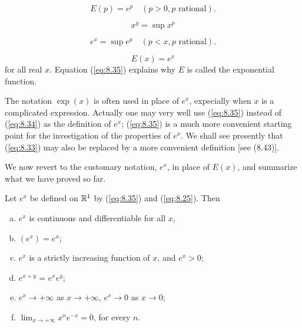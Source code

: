 \begin{equation}
    \label{eq:8.32}
    E(p) = e^p
    \quad (p>0, p \text{ rational}).
\end{equation}

\begin{equation}
    \label{eq:8.33}
    x^y = \sup x^p
\end{equation}

\begin{equation}
    \label{eq:8.34}
    e^x = \sup e^p
    \quad (p<x, p \text{ rational}).
\end{equation}

\begin{equation}
    \label{eq:8.35}
    E(x) = e^x
\end{equation}
for all real $x$. Equation (\ref{eq:8.35}) explains why $E$ is called the exponential function.

The notation $\exp(x)$ is often used in place of $e^x$, 
expecially when $x$ is a complicated expression.
Actually one may very well use (\ref{eq:8.35}) instead of (\ref{eq:8.34}) as the definition of $e^x$;
(\ref{eq:8.35}) is a much more convenient starting point for the investigation of the properties of $e^x$. 
We shall see presently that (\ref{eq:8.33}) may also be replaced by a
more convenient definition 
[see (8.43)].

We now revert to the customary notation, $e^x$, in place of $E(x)$, 
and summarize what we have proved so far.

\begin{thm}
    \label{thm:8.6}
    Let $e^x$ be defined on ${\protect\mathbb R}^1$ by (\ref{eq:8.35}) and (\ref{eq:8.25}). Then
    \begin{enumerate}[(a)]
        \item $e^x$ is continuous and differentiable for all $x$,
        \item $(e^x) = e^x$;
        \item $e^x$ is a strictly increasing function of $x$, and $e^x > 0$;
        \item $e^{x+y}$ = $e^x e^y$;
        \item $e^x \rightarrow +\infty$ as $x \rightarrow +\infty$, $e^x \rightarrow 0$ as $x \rightarrow 0$;
        \item $\lim_{x \to +\infty}  x^n e^{-x} = 0$, for every $n$.
    \end{enumerate}
\end{thm}

